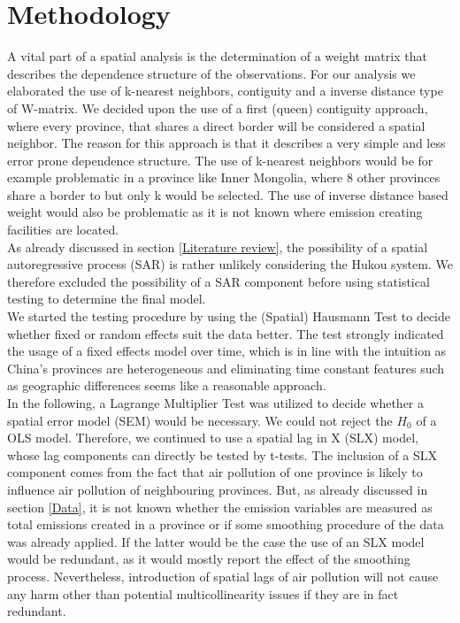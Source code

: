 \documentclass[
]{article}
\begin{document}
	\section{Methodology} \label{Methodology}
	A vital part of a spatial analysis is the determination of a weight matrix that describes the dependence structure of the observations. For our analysis we elaborated the use of k-nearest neighbors, contiguity and a inverse distance type of W-matrix. We decided upon the use of a first (queen) contiguity approach, where every province, that shares a direct border will be considered a spatial neighbor. The reason for this approach is that it describes a very simple and less error prone dependence structure. The use of k-nearest neighbors would be for example problematic in a province like Inner Mongolia, where 8 other provinces share a border to but only k would be selected. The use of inverse distance based weight would also be problematic as it is not known where emission creating facilities are located. \\
	As already discussed in section \ref{Literature review}, the possibility of a spatial autoregressive process (SAR) is rather unlikely considering the Hukou system. We therefore excluded the possibility of a SAR component before using statistical testing to determine the final model.\\
	We started the testing procedure by using the (Spatial) Hausmann Test to decide whether fixed or random effects suit the data better. The test strongly indicated the usage of a fixed effects model over time, which is in line with the intuition as China's provinces are heterogeneous and eliminating time constant features such as geographic differences seems like a reasonable approach.\\
	In the following, a Lagrange Multiplier Test was utilized to decide whether a spatial error model (SEM) would be necessary. We could not reject the $H_0$ of a OLS model. Therefore, we continued to use a spatial lag in X (SLX) model, whose lag components can directly be tested by t-tests. The inclusion of a SLX component comes from the fact that air pollution of one province is likely to influence air pollution of neighbouring provinces. But, as already discussed in section \ref{Data}, it is not known whether the emission variables are measured as total emissions created in a province or if some smoothing procedure of the data was already applied. If the latter would be the case the use of an SLX model would be redundant, as it would mostly report the effect of the smoothing process. Nevertheless, introduction of spatial lags of air pollution will not cause any harm other than potential multicollinearity issues if they are in fact redundant.\\
\end{document}
